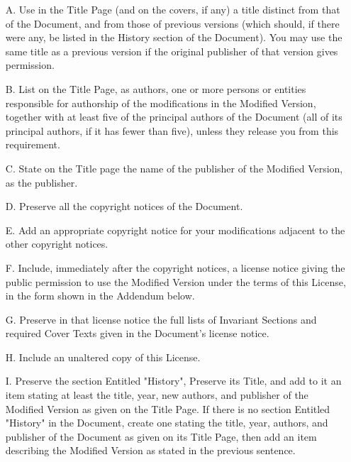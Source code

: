 \begin{itemize}
\item[A.] 
   Use in the Title Page (and on the covers, if any) a title distinct
   from that of the Document, and from those of previous versions
   (which should, if there were any, be listed in the History section
   of the Document).  You may use the same title as a previous version
   if the original publisher of that version gives permission.
   
\item[B.]
   List on the Title Page, as authors, one or more persons or entities
   responsible for authorship of the modifications in the Modified
   Version, together with at least five of the principal authors of the
   Document (all of its principal authors, if it has fewer than five),
   unless they release you from this requirement.
   
\item[C.]
   State on the Title page the name of the publisher of the
   Modified Version, as the publisher.
   
\item[D.]
   Preserve all the copyright notices of the Document.
   
\item[E.]
   Add an appropriate copyright notice for your modifications
   adjacent to the other copyright notices.
   
\item[F.]
   Include, immediately after the copyright notices, a license notice
   giving the public permission to use the Modified Version under the
   terms of this License, in the form shown in the Addendum below.
   
\item[G.]
   Preserve in that license notice the full lists of Invariant Sections
   and required Cover Texts given in the Document's license notice.
   
\item[H.]
   Include an unaltered copy of this License.
   
\item[I.]
   Preserve the section Entitled "History", Preserve its Title, and add
   to it an item stating at least the title, year, new authors, and
   publisher of the Modified Version as given on the Title Page.  If
   there is no section Entitled "History" in the Document, create one
   stating the title, year, authors, and publisher of the Document as
   given on its Title Page, then add an item describing the Modified
   Version as stated in the previous sentence.
   

\end{itemize}
